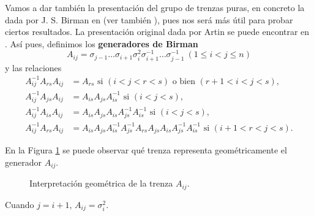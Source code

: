 \documentclass[bibtex, anon]{TEMat-article}
\begin{document}
Vamos a dar también la presentación del grupo de trenzas puras, en concreto la dada por J. S. Birman en \cite{Birman} (ver también \cite{polynomial}), pues nos será más útil para probar ciertos resultados. La presentación original dada por Artin se puede encontrar en \cite{Artin}. Así pues, definimos los \textbf{generadores de Birman}
\begin{equation}\label{birman}
A_{ij}=\sigma_{j-1}\dots\sigma_{i+1}\sigma_i^2\sigma_{i+1}^{-1}\dots\sigma_{j-1}^{-1}\ (1\leq i<j\leq n)
\end{equation}
y las relaciones %
\begin{align*}
A_{ij}^{-1}A_{rs}A_{ij}&=A_{rs}\text{ si } (i<j<r<s)\text{ o bien } (r+1<i<j<s),\\
A_{ij}^{-1}A_{js}A_{ij}&=A_{is}A_{js}A_{is}^{-1} \text{ si } (i<j<s),\\
A_{ij}^{-1}A_{is}A_{ij}&=A_{is}A_{js}A_{is}A_{js}^{-1}A_{is}^{-1}\text{ si } (i<j<s),\\
A_{ij}^{-1}A_{rs}A_{ij}&=A_{is}A_{js}A_{is}^{-1}A_{js}^{-1}A_{rs}A_{js}A_{is}A_{js}^{-1}A_{is}^{-1}\text{ si } (i+1<r<j<s).
\end{align*}

En la Figura \ref{generador} se puede observar qué trenza representa geométricamente el generador $A_{ij}$. 

\begin{figure}[h!]
	\centering
	\caption{Interpretación geométrica de la trenza $A_{ij}$.}\label{generador}
\end{figure}


\begin{nota}
	Cuando $j=i+1$, $A_{ij}=\sigma_i^2$. 
\end{nota}
\end{document}
